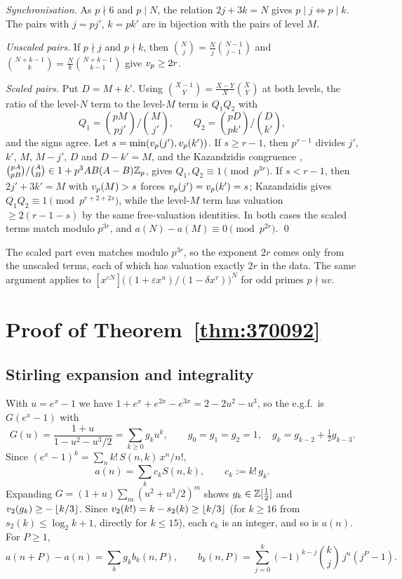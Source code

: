 \documentclass[11pt]{amsart}
\begin{document}
\emph{Synchronisation.} As $p\nmid6$ and $p\mid N$, the relation $2j+3k=N$ gives $p\mid j\iff p\mid k$. The pairs with $j=pj'$, $k=pk'$ are in bijection with the pairs of level $M$.

\emph{Unscaled pairs.} If $p\nmid j$ and $p\nmid k$, then $\binom Nj=\frac Nj\binom{N-1}{j-1}$ and $\binom{N+k-1}k=\frac Nk\binom{N+k-1}{k-1}$ give $v_p\ge2r$.

\emph{Scaled pairs.} Put $D=M+k'$. Using $\binom{X-1}Y=\frac{X-Y}X\binom XY$ at both levels, the ratio of the level-$N$ term to the level-$M$ term is $Q_1Q_2$ with
\[ Q_1=\binom{pM}{pj'}\Big/\binom M{j'},\qquad Q_2=\binom{pD}{pk'}\Big/\binom D{k'}, \]
and the signs agree. Let $s=\min(v_p(j'),v_p(k'))$. If $s\ge r-1$, then $p^{r-1}$ divides $j'$, $k'$, $M$, $M-j'$, $D$ and $D-k'=M$, and the Kazandzidis congruence \cite{kazandzidis1968,robertzuber1995}, $\binom{pA}{pB}/\binom AB\in1+p^3AB(A-B)\mathbb{Z}_{p}$, gives $Q_1,Q_2\equiv1\pmod{p^{3r}}$. If $s<r-1$, then $2j'+3k'=M$ with $v_p(M)>s$ forces $v_p(j')=v_p(k')=s$; Kazandzidis gives $Q_1Q_2\equiv1\pmod{p^{r+2+2s}}$, while the level-$M$ term has valuation $\ge2(r-1-s)$ by the same free-valuation identities. In both cases the scaled terms match modulo $p^{3r}$, and $a(N)-a(M)\equiv0\pmod{p^{2r}}$. \qed

\begin{remark}
The scaled part even matches modulo $p^{3r}$, so the exponent $2r$ comes only from the unscaled terms, each of which has valuation exactly $2r$ in the data. The same argument applies to $[x^{cN}]\bigl((1+\varepsilon x^u)/(1-\delta x^v)\bigr)^N$ for odd primes $p\nmid uv$.
\end{remark}

\section{Proof of Theorem~\ref{thm:370092}}\label{sec:370092}

\subsection{Stirling expansion and integrality}
With $u=e^x-1$ we have $1+e^x+e^{2x}-e^{3x}=2-2u^2-u^3$, so the e.g.f.\ is $G(e^x-1)$ with
\[ G(u)=\frac{1+u}{1-u^2-u^3/2}=\sum_{k\ge0}g_ku^k,\qquad g_0=g_1=g_2=1,\quad g_k=g_{k-2}+\tfrac12g_{k-3}. \]
Since $(e^x-1)^k=\sum_nk!\,S(n,k)\,x^n/n!$,
\begin{equation}\label{eq:stir}
a(n)=\sum_{k}c_kS(n,k),\qquad c_k:=k!\,g_k.
\end{equation}
Expanding $G=(1+u)\sum_m(u^2+u^3/2)^m$ shows $g_k\in\mathbb{Z}[\tfrac12]$ and $v_2(g_k)\ge-\left\lfloor k/3\right\rfloor$. Since $v_2(k!)=k-s_2(k)\ge\left\lfloor k/3\right\rfloor$ (for $k\ge16$ from $s_2(k)\le\log_2k+1$, directly for $k\le15$), each $c_k$ is an integer, and so is $a(n)$. For $P\ge1$,
\begin{equation}\label{eq:diff}
a(n+P)-a(n)=\sum_kg_kb_k(n,P),\qquad b_k(n,P)=\sum_{j=0}^{k}(-1)^{k-j}\binom kj\,j^n(j^P-1).
\end{equation}
\end{document}
